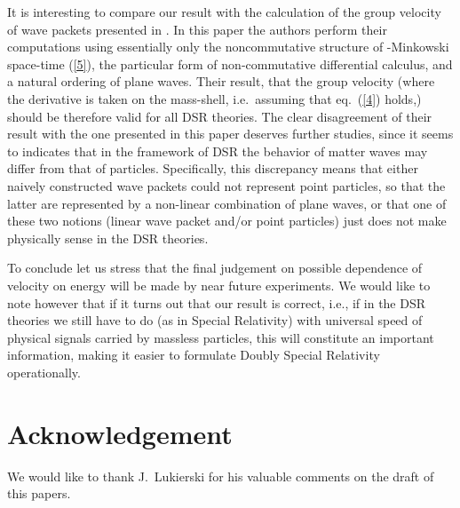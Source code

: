 \documentclass  [12pt] {article}
\begin{document}
It is interesting to compare our result with the calculation of the group
velocity of wave packets presented in \cite{Amelino-Camelia:2002tc}. In this
paper the authors perform their computations using essentially only the
noncommutative structure of \myHighlight{$\kappa$}\coordHE{}-Minkowski space-time (\ref{5}), the
particular form of non-commutative differential calculus, and a natural
ordering of plane waves. Their result, that the group velocity \coordHE{} (where the derivative is taken on the mass-shell, i.e.\ assuming that
eq.~(\ref{4}) holds,) should be therefore  valid for all DSR theories. The
clear disagreement of their result with
 the one presented in this paper deserves further studies, since it seems to
 indicates that in the framework of DSR the
 behavior of matter waves may differ from that of particles. Specifically, this discrepancy means that either
 naively constructed wave
 packets could not represent point particles, so that the latter are represented by a non-linear combination of plane waves,
 or that one of these two notions (linear wave packet and/or point particles) just does not make physically sense in the
 DSR theories.

 To conclude let us stress that the final judgement on possible dependence of velocity on
 energy will be made by near future experiments. We would like to note however that if it turns out that
 our result is correct, i.e., if in the DSR theories we still have to do (as in Special Relativity) with
 universal speed of physical signals carried by massless particles, this will constitute an important
 information, making it easier to formulate Doubly Special Relativity operationally.


\section*{Acknowledgement}
We would like to thank J.~Lukierski for his valuable comments on
the draft of this papers.
\end{document}
